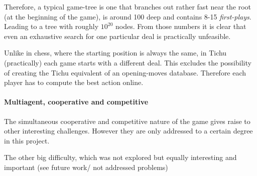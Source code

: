 Therefore, a typical game-tree is one that branches out rather fast near the root (at the beginning of the game), is around 100 deep and contains 8-15 \textit{first-plays}. Leading to a tree with roughly $10^{20}$ nodes.
From those numbers it is clear that even an exhaustive search for one particular deal is practically unfeasible.

Unlike in chess, where the starting position is always the same, in Tichu (practically) each game starts with a different deal. This excludes the possibility of creating the Tichu equivalent of an opening-moves database. Therefore each player has to compute the best action online. %


\paragraph{Multiagent, cooperative and competitive}
The simultaneous cooperative and competitive nature of the game gives raise to other interesting challenges. However they are only addressed to a certain degree in this project.

The other big difficulty, which was not explored but equally interesting and important (see future work/ not addressed problems) %
